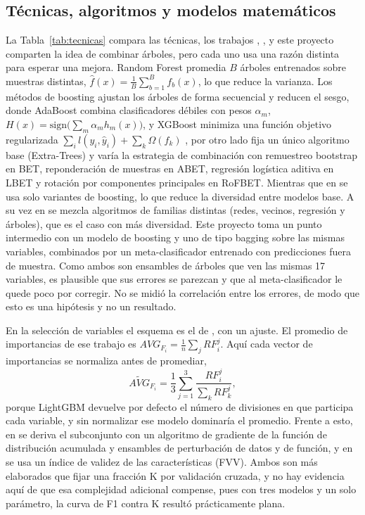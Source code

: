 \subsection{Técnicas, algoritmos y modelos matemáticos}

La Tabla~\ref{tab:tecnicas} compara las técnicas, los trabajos \cite{kalabarige2022multilayer}, \cite{kalabarige2023boosting},\cite{alsariera2020ai} y este proyecto comparten la idea de combinar árboles, pero cada uno usa una razón distinta para esperar una mejora. Random Forest promedia $B$ árboles entrenados sobre muestras distintas, $\hat{f}(x)=\frac{1}{B}\sum_{b=1}^{B} f_b(x)$, lo que reduce la varianza. Los métodos de boosting ajustan los árboles de forma secuencial y reducen el sesgo, donde AdaBoost combina clasificadores débiles con pesos $\alpha_m$, $H(x)=\mathrm{sign}\big(\sum_{m}\alpha_m h_m(x)\big)$, y XGBoost minimiza una función objetivo regularizada $\sum_i l(y_i,\hat{y}_i)+\sum_k \Omega(f_k)$ \cite{ahmad2025across}, por otro lado \cite{alsariera2020ai} fija un único algoritmo base (Extra-Trees) y varía la estrategia de combinación con remuestreo bootstrap en BET, reponderación de muestras en ABET, regresión logística aditiva en LBET y rotación por componentes principales en RoFBET. Mientras que en \cite{kalabarige2023boosting} se usa solo variantes de boosting, lo que reduce la diversidad entre modelos base. A su vez en \cite{kalabarige2022multilayer} se mezcla algoritmos de familias distintas (redes, vecinos, regresión y árboles), que es el caso con más diversidad. Este proyecto toma un punto intermedio con un modelo de boosting y uno de tipo bagging sobre las mismas variables, combinados por un meta-clasificador entrenado con predicciones fuera de muestra. Como ambos son ensambles de árboles que ven las mismas 17 variables, es plausible que sus errores se parezcan y que al meta-clasificador le quede poco por corregir. No se midió la correlación entre los errores, de modo que esto es una hipótesis y no un resultado. \newline

En la selección de variables el esquema es el de \cite{kalabarige2023boosting}, con un ajuste. El promedio de importancias de ese trabajo es $AVG_{F_i}=\frac{1}{n}\sum_j RF_i^j$. Aquí cada vector de importancias se normaliza antes de promediar,
\begin{equation}
\widetilde{AVG}_{F_i}=\frac{1}{3}\sum_{j=1}^{3}\frac{RF_i^{j}}{\sum_{k}RF_k^{j}},
\label{eq:avg}
\end{equation}
porque LightGBM devuelve por defecto el número de divisiones en que participa cada variable, y sin normalizar ese modelo dominaría el promedio. Frente a esto, en \cite{chiew2019hybrid} se deriva el subconjunto con un algoritmo de gradiente de la función de distribución acumulada y ensambles de perturbación de datos y de función, y en \cite{zhu2019ofsnn} se usa un índice de validez de las características (FVV). Ambos son más elaborados que fijar una fracción K por validación cruzada, y no hay evidencia aquí de que esa complejidad adicional compense, pues con tres modelos y un solo parámetro, la curva de F1 contra K resultó prácticamente plana. \newline

